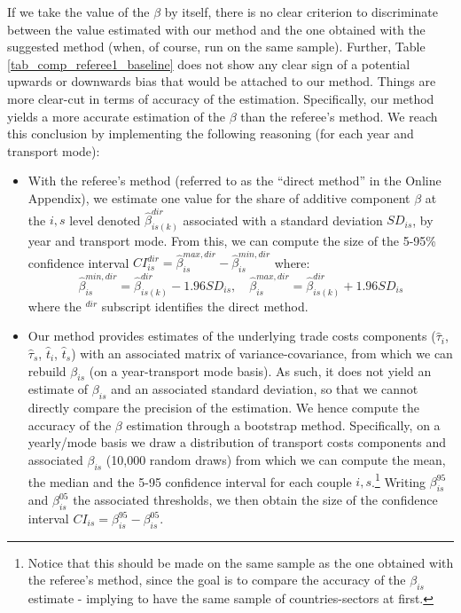 \documentclass[a4paper,11pt]{article}
\begin{document}
\begin{itemize}
If we take the value of the $\beta$ by itself, there is no clear criterion to discriminate between the value estimated with our method and the one obtained with the suggested method (when, of course, run on the same sample). Further, Table \ref{tab_comp_referee1_baseline} does not show any clear sign of a potential upwards or downwards bias that would be attached to our method. Things are more clear-cut in terms of accuracy of the estimation. Specifically, our method yields a more accurate estimation of the $\beta$ than the referee's method. We reach this conclusion by implementing the following reasoning (for each year and transport mode):
    \begin{itemize}
    \item With the referee's method (referred to as the ``direct method'' in the Online Appendix), we estimate one value for the share of additive component $\beta$ at the $i,s$ level denoted $\hat{\beta}^{dir}_{is(k)}$ associated with a standard deviation $SD_{is}$, by year and transport mode. From this, we can compute the size of the 5-95\% confidence interval $CI^{dir}_{is} = \hat{\beta}_{is}^{max,dir} - \hat{\beta}_{is}^{min,dir}$ where:
        $$\hat{\beta}_{is}^{min,dir} = \hat{\beta}^{dir}_{is(k)} - 1.96 SD_{is},\quad \hat{\beta}_{is}^{max,dir} = \hat{\beta}^{dir}_{is(k)} + 1.96 SD_{is}$$
\noindent where the $^{dir}$ subscript identifies the direct method.
        \item  Our method provides estimates of the underlying trade costs components ($\widehat{\tau}_i$, $\widehat{\tau}_s$, $\widehat{t}_i$, $\widehat{t}_s$) with an associated matrix of variance-covariance, from which we can rebuild $\beta_{is}$ (on a year-transport mode basis). As such, it does not yield an estimate of $\beta_{is}$ and an associated standard deviation, so that we cannot directly compare the precision of the estimation. We hence compute the accuracy of the $\beta$ estimation through a bootstrap method. Specifically, on a yearly/mode basis we draw a distribution of transport costs components and associated $\beta_{is}$ (10,000 random draws) from which we can compute the mean, the median and the 5-95 confidence interval for each couple $i,s$.\footnote{Notice that this should be made on the same sample as the one obtained with the referee's method, since the goal is to compare the accuracy of the $\beta_{is}$ estimate - implying to have the same sample of countries-sectors at first. } Writing $\beta_{is}^{95}$ and $\beta_{is}^{05}$ the associated thresholds, we then obtain the size of the confidence interval $CI_{is}= \beta_{is}^{95}- \beta_{is}^{05}$.




\end{itemize}
\end{itemize}
\end{document}
